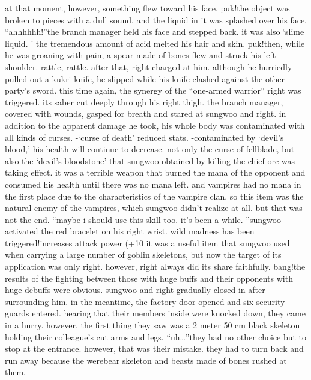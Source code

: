 at that moment, however, something flew toward his face.
puk!the object was broken to pieces with a dull sound.
 and the liquid in it was splashed over his face.
“ahhhhhh!”the branch manager held his face and stepped back.
 it was also ‘slime liquid.
’ the tremendous amount of acid melted his hair and skin.
puk!then, while he was groaning with pain, a spear made of bones flew and struck his left shoulder.
rattle, rattle.
after that, right charged at him.
 although he hurriedly pulled out a kukri knife, he slipped while his knife clashed against the other party’s sword.
 this time again, the synergy of the “one-armed warrior” right was triggered.
its saber cut deeply through his right thigh.
the branch manager, covered with wounds, gasped for breath and stared at sungwoo and right.
 in addition to the apparent damage he took, his whole body was contaminated with all kinds of curses.
-‘curse of death’ reduced stats.
-contaminated by ‘devil’s blood,’ his health will continue to decrease.
not only the curse of fellblade, but also the ‘devil’s bloodstone’ that sungwoo obtained by killing the chief orc was taking effect.
 it was a terrible weapon that burned the mana of the opponent and consumed his health until there was no mana left.
and vampires had no mana in the first place due to the characteristics of the vampire clan.
so this item was the natural enemy of the vampires, which sungwoo didn’t realize at all.
but that was not the end.
“maybe i should use this skill too.
 it’s been a while.
”sungwoo activated the red bracelet on his right wrist.
wild madness has been triggered!increases attack power (+10%
it was a useful item that sungwoo used when carrying a large number of goblin skeletons, but now the target of its application was only right.
 however, right always did its share faithfully.
bang!the results of the fighting between those with huge buffs and their opponents with huge debuffs were obvious.
 sungwoo and right gradually closed in after surrounding him.
in the meantime, the factory door opened and six security guards entered.
 hearing that their members inside were knocked down, they came in a hurry.
however, the first thing they saw was a 2 meter 50 cm black skeleton holding their colleague’s cut arms and legs.
“uh…”they had no other choice but to stop at the entrance.
 however, that was their mistake.
 they had to turn back and run away because the werebear skeleton and beasts made of bones rushed at them.


